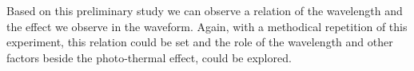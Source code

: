 Based on this preliminary study we can observe a relation of the wavelength and the effect we observe in the waveform. Again, with a methodical repetition of this experiment, this relation could be set and the role of the wavelength and other factors beside the photo-thermal effect, could be explored.